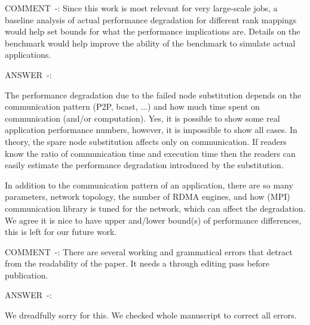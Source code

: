 \documentclass[]{letter}
\newcounter{reviewer}
\newcounter{commentno}[reviewer]
\newcommand{\REVIEW}[2]{
\stepcounter{commentno}
\begin{description}
\item{COMMENT~\thereviewer-\thecommentno: }
#1%
\item{ANSWER~\thereviewer-\thecommentno: }
#2%
\end{description}
\vspace{3mm}
}
\begin{document}
\begin{description}
\REVIEW{Since this work is most relevant for very
large-scale jobs, a baseline analysis of actual performance
degradation for different rank mappings would help set bounds for what
the performance implications are. Details on the benchmark would help
improve the ability of the benchmark to simulate actual
applications. }
{
The performance degradation due to the failed node substitution
depends on the communication pattern (P2P, bcast, ...) and how much
time spent on communication (and/or computation). Yes, it is possible
to show some real application performance numbers, however, it is
impossible to show all cases. In theory, the spare node substitution
affects only on communication. If readers know the ratio of
communication time and execution time then the readers can easily
estimate the performance degradation introduced by the substitution.

In addition to the communication pattern of an application, there are
so many parameters, network topology, the number of RDMA engines, and 
how (MPI) communication library is tuned for the network, which can
affect the degradation. We agree it is nice to have upper and/lower bound(s) of
performance differences, this is left for our future work.
}

\REVIEW{There are several working and grammatical errors that
detract from the readability of the paper. It needs a through editing
pass before publication. }
{
We dreadfully sorry for this. We checked whole manuscript to correct
all errors.
}

\end{description}
\end{document}

